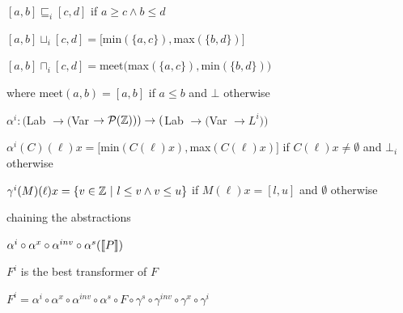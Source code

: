 			\enumend
			\item $[a,b] \sqsubseteq_i [c,d]$ if $a \ge c \land b \le d$
			\item $[a,b] \sqcup_i [c,d] = [$min$(\{a,c\}), $max$(\{b,d\})]$
			\item $[a,b] \sqcap_i [c,d] = $meet$($max$(\{a,c\}),$min$(\{b,d\}))$
			\item where meet$(a,b) = [a,b]$ if $a \le b$ and $\bot$ otherwise
			\item $\alpha^i: ($Lab $ \rightarrow ($Var $ \rightarrow \mathcal{P}(\mathbb{Z}))) \rightarrow ($Lab $\rightarrow ($Var $\rightarrow L^i))$
			\item $\alpha^i(C)(\ell)x = [$min$(C(\ell)x), $max$(C(\ell)x)]$ if $C(\ell)x \ne \emptyset$ and $\bot_i$ otherwise
			\item $\gamma^i(M)(\ell)x = \{v \in \mathbb{Z} \ | \ l \le v \land  v \le u\}$ if $M(\ell)x = [l, u]$ and $\emptyset$ otherwise
		\enumend
		\item chaining the abstractions
		\enumstart
			\item $\alpha^i \circ \alpha^x \circ \alpha^{inv} \circ \alpha^s(\llbracket P \rrbracket)$
			\item $F^i$ is the best transformer of $F$
			\item $F^i = \alpha^i \circ \alpha^x \circ \alpha^{inv} \circ \alpha^s \circ F \circ \gamma^s \circ \gamma^{inv} \circ \gamma^x \circ \gamma^i$
		\enumend
	\enumend
\enumend

